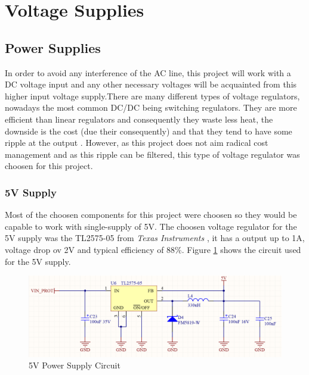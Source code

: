 \section{Voltage Supplies}\label{sec:voltage-supplies}

	\subsection{Power Supplies}\label{ssec:power-supplies}
		In order to avoid any interference of the AC line, this project will work with a DC voltage input and any other necessary voltages will be acquainted from this higher input voltage supply.There are many different types of voltage regulators, nowadays the most common DC/DC being switching regulators. They are more efficient than linear regulators and consequently they waste less heat, the downside is the cost (due their consequently) and that they tend to have some ripple at the output \cite{schweber2017}. However, as this project does not aim radical cost management and as this ripple can be filtered, this type of voltage regulator was choosen for this project.

		\subsubsection{5V Supply}\label{sssec:5v-supply}
			Most of the choosen components for this project were choosen so they would be capable to work with single-supply of 5V. The choosen voltage regulator for the 5V supply was the TL2575-05 from \textit{Texas Instruments} \cite{tl2575-05-datasheet}, it has a output up to 1A, voltage drop ov 2V and typical efficiency of 88$\%$. Figure \ref{fig:tl2575-05-circuit} shows the circuit used for the 5V supply.

			\begin{figure}[htbp]
				\centering
					\includegraphics[scale=1.5]{figuras/fig-tl2575-05-circuit.png}
				\caption{5V Power Supply Circuit \cite{tl2575-05-circuit}}
				\label{fig:tl2575-05-circuit}
			\end{figure}


